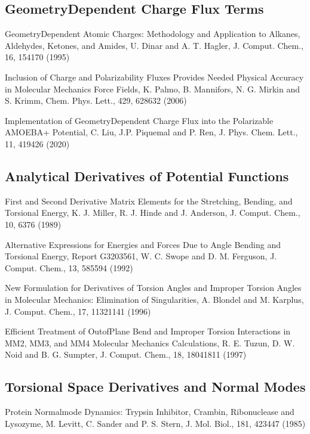\documentclass[letterpaper,11pt,english]{sphinxmanual}
\begin{document}
\subsection{Geometry\sphinxhyphen{}Dependent Charge Flux Terms}
\label{\detokenize{text/references:geometry-dependent-charge-flux-terms}}
Geometry\sphinxhyphen{}Dependent Atomic Charges: Methodology and Application to Alkanes, Aldehydes, Ketones, and Amides, U. Dinar and A. T. Hagler, J. Comput. Chem., 16, 154\sphinxhyphen{}170 (1995)

Inclusion of Charge and Polarizability Fluxes Provides Needed Physical Accuracy in Molecular Mechanics Force Fields, K. Palmo, B. Mannifors, N. G. Mirkin and S. Krimm, Chem. Phys. Lett., 429, 628\sphinxhyphen{}632 (2006)

Implementation of Geometry\sphinxhyphen{}Dependent Charge Flux into the Polarizable AMOEBA+ Potential, C. Liu, J.\sphinxhyphen{}P. Piquemal and P. Ren, J. Phys. Chem. Lett., 11, 419\sphinxhyphen{}426 (2020)


\subsection{Analytical Derivatives of Potential Functions}
\label{\detokenize{text/references:analytical-derivatives-of-potential-functions}}
First and Second Derivative Matrix Elements for the Stretching, Bending, and Torsional Energy, K. J. Miller, R. J. Hinde and J. Anderson, J. Comput. Chem., 10, 63\sphinxhyphen{}76 (1989)

Alternative Expressions for Energies and Forces Due to Angle Bending and Torsional Energy, Report G320\sphinxhyphen{}3561, W. C. Swope and D. M. Ferguson, J. Comput. Chem., 13, 585\sphinxhyphen{}594 (1992)

New Formulation for Derivatives of Torsion Angles and Improper Torsion Angles in Molecular Mechanics: Elimination of Singularities, A. Blondel and M. Karplus, J. Comput. Chem., 17, 1132\sphinxhyphen{}1141 (1996)

Efficient Treatment of Out\sphinxhyphen{}of\sphinxhyphen{}Plane Bend and Improper Torsion Interactions in MM2, MM3, and MM4 Molecular Mechanics Calculations, R. E. Tuzun, D. W. Noid and B. G. Sumpter, J. Comput. Chem., 18, 1804\sphinxhyphen{}1811 (1997)


\subsection{Torsional Space Derivatives and Normal Modes}
\label{\detokenize{text/references:torsional-space-derivatives-and-normal-modes}}
Protein Normal\sphinxhyphen{}mode Dynamics:  Trypsin Inhibitor, Crambin, Ribonuclease and Lysozyme, M. Levitt, C. Sander and P. S. Stern, J. Mol. Biol., 181, 423\sphinxhyphen{}447 (1985)
\end{document}
